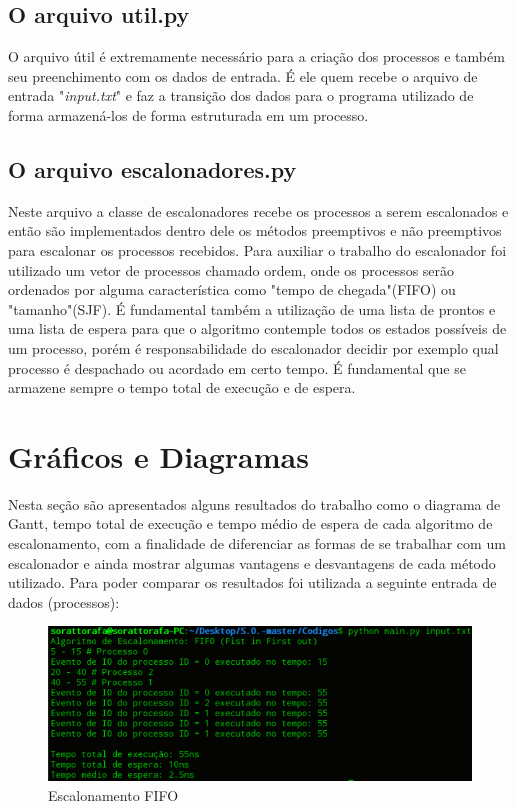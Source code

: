 \documentclass[times, 10pt,twocolumn]{article}
\begin{document}
\subsection{O arquivo util.py}  
O arquivo útil é extremamente necessário para a criação dos processos e  também seu preenchimento com os dados de entrada. É ele quem recebe o arquivo de entrada "\textit{input.txt}" e faz a transição dos dados para o programa utilizado de forma armazená-los de forma estruturada em um processo.
\subsection{O arquivo escalonadores.py} 
Neste arquivo a classe de escalonadores recebe os processos a serem escalonados e então são implementados dentro dele os métodos preemptivos e não preemptivos para escalonar os processos recebidos. Para auxiliar o trabalho do escalonador foi utilizado um vetor de processos chamado ordem, onde os processos serão ordenados por alguma característica como "tempo de chegada"(FIFO) ou "tamanho"(SJF). É fundamental também a utilização de uma lista de prontos e uma lista de espera para que o algoritmo contemple todos os estados possíveis de um processo, porém é responsabilidade do escalonador decidir por exemplo qual processo é despachado ou acordado em certo tempo. É fundamental que se armazene sempre o tempo total de execução e de espera.

\section{Gráficos e Diagramas}
Nesta seção são apresentados alguns resultados do trabalho como o diagrama de Gantt, tempo total de execução e tempo médio de espera de cada algoritmo de escalonamento, com a finalidade de diferenciar as formas de se trabalhar com um escalonador e ainda mostrar algumas vantagens e desvantagens de cada método utilizado. Para poder comparar os resultados foi utilizada a seguinte entrada de dados (processos): 

\begin{figure}[H]
    \centering
    \includegraphics[width=.5\textwidth]{figuras/fifo}
    \caption{Escalonamento FIFO}
    \label{fig:figura-001}
\end{figure}   
 
\end{document}

